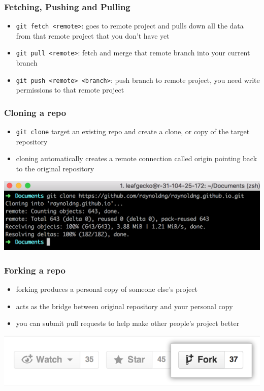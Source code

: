 \documentclass[12pt]{beamer}
\begin{document}
\begin{frame}
\frametitle{Fetching, Pushing and Pulling}
\begin{itemize}
	\item \texttt{git fetch <remote>}: goes to remote project and pulls down all the data from that remote project that you don’t have yet
	\item \texttt{git pull <remote>}: fetch and merge that remote branch into your current branch
	\item \texttt{git push <remote> <branch>}: push branch to remote project, you need write permissions to that remote project
\end{itemize}
\end{frame}

\begin{frame}
\frametitle{Cloning a repo}
\begin{itemize}
	\item \texttt{git clone} target an existing repo and create a clone, or copy of the target repository
	\item cloning automatically creates a remote connection called origin pointing back to the original repository
\end{itemize}
\begin{center}
	\includegraphics[width=\linewidth]{git_clone}
\end{center}
\end{frame}

\begin{frame}
\frametitle{Forking a repo}
\begin{itemize}
	\item forking produces a personal copy of someone else's project
	\item acts as the bridge between original repository and your personal copy
	\item you can submit pull requests to help make other people's project better
\end{itemize}
\begin{center}
	\includegraphics[width=0.8\linewidth]{forking}
\end{center}
\end{frame}
\end{document}
